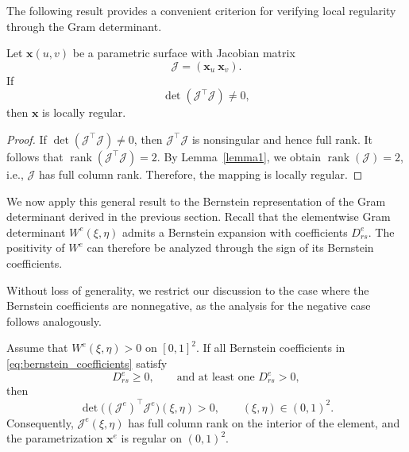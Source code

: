 \documentclass{jssc}
\begin{document}
The following result provides a convenient criterion for verifying local regularity through the Gram determinant.

\begin{theorem}
Let $\mathbf{x}(u,v)$ be a parametric surface with Jacobian matrix
\begin{equation}
    \bm{\mathcal{J}} = (\mathbf{x}_u \ \mathbf{x}_v).
\end{equation}
If
\begin{equation}
    \det(\bm{\mathcal{J}}^\top \bm{\mathcal{J}}) \neq 0,
\end{equation}
then $\mathbf{x}$ is locally regular.
\end{theorem}

\begin{proof}
If $\det(\bm{\mathcal{J}}^\top \bm{\mathcal{J}}) \neq 0$, then $\bm{\mathcal{J}}^\top \bm{\mathcal{J}}$ is nonsingular and hence full rank. 
It follows that $\operatorname{rank}(\bm{\mathcal{J}}^\top \bm{\mathcal{J}}) = 2$. 
By Lemma~\ref{lemma1}, we obtain $\operatorname{rank}(\bm{\mathcal{J}}) = 2$, i.e., $\bm{\mathcal{J}}$ has full column rank. 
Therefore, the mapping is locally regular.
\end{proof}

We now apply this general result to the Bernstein representation of the Gram determinant derived in the previous section. Recall that the elementwise Gram determinant $W^e(\xi,\eta)$ admits a Bernstein expansion with coefficients $D_{rs}^e$. The positivity of $W^e$ can therefore be analyzed through the sign of its Bernstein coefficients.

Without loss of generality, we restrict our discussion to the case where the Bernstein coefficients are nonnegative, as the analysis for the negative case follows analogously.

\begin{theorem}
\label{cor:regularity}
Assume that $W^e(\xi,\eta)>0$ on $[0,1]^2$. 
If all Bernstein coefficients in \eqref{eq:bernstein_coefficients} satisfy
\begin{equation}
D_{rs}^e \ge 0,
\qquad
\text{and at least one } D_{rs}^e > 0,
\end{equation}
then
\begin{equation}
\det\!\big((\bm{\mathcal{J}}^e)^\top\bm{\mathcal{J}}^e\big)(\xi,\eta)>0,
\qquad
(\xi,\eta)\in(0,1)^2.
\end{equation}
Consequently, $\bm{\mathcal{J}}^e(\xi,\eta)$ has full column rank on the interior of the element, and the parametrization $\bm{x}^e$ is regular on $(0,1)^2$.
\end{theorem}
\end{document}
